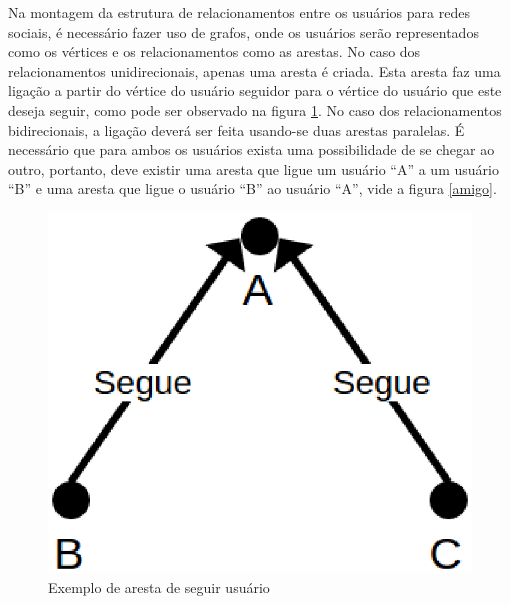 Na montagem da estrutura de relacionamentos entre os usuários para redes sociais, é necessário fazer uso de grafos, onde os usuários serão representados como os vértices e os relacionamentos como as arestas. No caso dos relacionamentos unidirecionais, apenas uma aresta é criada. Esta aresta faz uma ligação a partir do vértice do usuário seguidor para o vértice do usuário que este deseja seguir, como pode ser observado na figura \ref{segue}. No caso dos relacionamentos bidirecionais, a ligação deverá ser feita usando-se duas arestas paralelas. É necessário que para ambos os usuários exista uma possibilidade de se chegar ao outro, portanto, deve existir uma aresta que ligue um usuário ``A'' a um usuário ``B'' e uma aresta que ligue o usuário ``B'' ao usuário ``A'', vide a figura \ref{amigo}.

\begin{figure}[!h]
	\centering
	\includegraphics[scale=0.45]{figuras/capitulo5/segue.eps}
	\caption{Exemplo de aresta de seguir usuário}
	\label{segue}
\end{figure}

